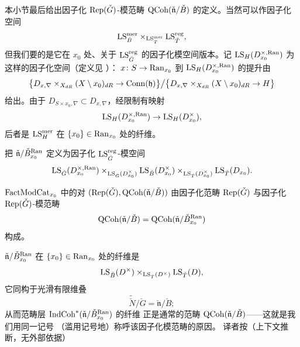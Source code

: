 本小节最后给出因子化 $\mathrm{Rep}(\check G)$-模范畴 $\mathrm{QCoh}(\check{\mathfrak{n}}/\check B)$
的定义。当然可以作因子化空间
\[
\mathrm{LS}^{\mathrm{mer}}_{\check B}\times_{\mathrm{LS}^{\mathrm{mer}}_{\check T}}\mathrm{LS}^{\mathrm{reg}}_{\check T},
\]
但我们要的是它在 $x_0$ 处、关于 $\mathrm{LS}^{\mathrm{reg}}_{\check G}$ 的因子化模空间版本。记
$\mathrm{LS}_H(D^{\times,\mathrm{Ran}}_{x_0})$ 为这样的因子化空间（定义见 \cite[定义 3.1.8]{Bog24}）：
$x\colon S\to \mathrm{Ran}_{x_0}$ 到 $\mathrm{LS}_H(D^{\times,\mathrm{Ran}}_{x_0})$ 的提升由
\[
\bigl\{D_{x,\nabla}\times_{X_{dR}}(X\setminus x_0)_{dR}\to \mathrm{Conn}(\mathfrak{h})\bigr\}
\big/\bigl\{D_{x,\nabla}\times_{X_{dR}}(X\setminus x_0)_{dR}\to H\bigr\}
\]
给出。由于 $D_{S\times x_0,\nabla}\subset D_{x,\nabla}$，经限制有映射
\[
\mathrm{LS}_H(D^{\times,\mathrm{Ran}}_{x_0})\to \mathrm{LS}_H(D^\times_{x_0}),
\]
后者是 $\mathrm{LS}^{\mathrm{mer}}_H$ 在 $\{x_0\}\in \mathrm{Ran}_{x_0}$ 处的纤维。

把 $\check{\mathfrak{n}}/\check B^{\mathrm{Ran}}_{x_0}$ 定义为因子化 $\mathrm{LS}^{\mathrm{reg}}_{\check G}$-模空间
\[
\mathrm{LS}_{\check G}(D^{\times,\mathrm{Ran}}_{x_0})
\times_{\mathrm{LS}_{\check G}(D^\times_{x_0})}
\mathrm{LS}_{\check B}(D^\times_{x_0})
\times_{\mathrm{LS}_{\check T}(D^\times_{x_0})}
\mathrm{LS}_{\check T}(D_{x_0}).
\]

\begin{definition}
\label{def:rep-nB}
$\mathrm{FactModCat}_{x_0}$ 中的对 $(\mathrm{Rep}(\check G),\mathrm{QCoh}(\check{\mathfrak{n}}/\check B))$
由因子化范畴 $\mathrm{Rep}(\check G)$ 与因子化 $\mathrm{Rep}(\check G)$-模范畴
\[
\mathrm{QCoh}(\check{\mathfrak{n}}/\check B)
=\mathrm{QCoh}(\check{\mathfrak{n}}/\check B^{\mathrm{Ran}}_{x_0})
\]
构成。
\end{definition}

\begin{remark}
\label{rem:nB-fiber}
$\check{\mathfrak{n}}/\check B^{\mathrm{Ran}}_{x_0}$ 在 $\{x_0\}\in \mathrm{Ran}_{x_0}$ 处的纤维是
\[
\mathrm{LS}_{\check B}(D^\times)\times_{\mathrm{LS}_{\check T}(D^\times)}\mathrm{LS}_{\check T}(D),
\]
它同构于光滑有限维叠
\[
\widetilde{\check N}/\check G=\check{\mathfrak{n}}/\check B;
\]
从而范畴层 $\mathrm{IndCoh}^{*}(\check{\mathfrak{n}}/\check B^{\mathrm{Ran}}_{x_0})$ 的纤维
正是通常的范畴 $\mathrm{QCoh}(\check{\mathfrak{n}}/\check B)$——这就是我们用同一记号
（滥用记号地）称呼该因子化模范畴的原因。
{译者按（上下文推断，无外部依据）}
\end{remark}

